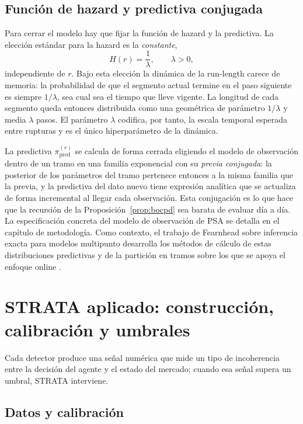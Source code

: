 \subsection{Función de hazard y predictiva conjugada}
\label{sec:bocpd-hazard}

Para cerrar el modelo hay que fijar la función de hazard y la predictiva. La elección estándar para la hazard es la \emph{constante},
\[
H(r) = \frac{1}{\lambda}, \qquad \lambda > 0,
\]
independiente de $r$. Bajo esta elección la dinámica de la run-length carece de memoria: la probabilidad de que el segmento actual termine en el paso siguiente es siempre $1/\lambda$, sea cual sea el tiempo que lleve vigente. La longitud de cada segmento queda entonces distribuida como una geométrica de parámetro $1/\lambda$ y media $\lambda$ pasos. El parámetro $\lambda$ codifica, por tanto, la escala temporal esperada entre rupturas y es el único hiperparámetro de la dinámica.

La predictiva $\pi^{(r)}_{\mathrm{pred}}$ se calcula de forma cerrada eligiendo el modelo de observación dentro de un tramo en una familia exponencial con su \emph{previa conjugada}: la posterior de los parámetros del tramo pertenece entonces a la misma familia que la previa, y la predictiva del dato nuevo tiene expresión analítica que se actualiza de forma incremental al llegar cada observación. Esta conjugación es lo que hace que la recursión de la Proposición~\ref{prop:bocpd} sea barata de evaluar día a día. La especificación concreta del modelo de observación de PSA se detalla en el capítulo de metodología. Como contexto, el trabajo de Fearnhead sobre inferencia exacta para modelos multipunto desarrolla los métodos de cálculo de estas distribuciones predictivas y de la partición en tramos sobre los que se apoya el enfoque online \cite{fearnhead2006}.

\section{STRATA aplicado: construcción, calibración y umbrales}
\label{sec:strata-aplicado}

Cada detector produce una señal numérica que mide un tipo de incoherencia entre la decisión del agente y el estado del mercado; cuando esa señal supera un umbral, STRATA interviene.

\subsection{Datos y calibración}
\label{sec:strata-calib}

